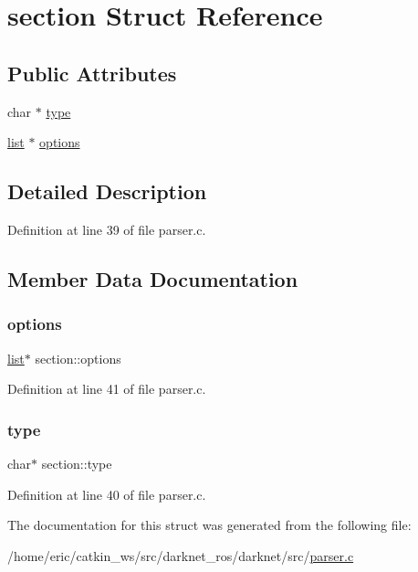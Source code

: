 \hypertarget{structsection}{}\section{section Struct Reference}
\label{structsection}
\subsection*{Public Attributes}
\begin{DoxyCompactItemize}
\item 
char $\ast$ \mbox{\hyperlink{structsection_a0dc7e80c65705ebee2764d1f1fe590f8}{type}}
\item 
\mbox{\hyperlink{structlist}{list}} $\ast$ \mbox{\hyperlink{structsection_a43f5552e0f6189b021835005204f3da6}{options}}
\end{DoxyCompactItemize}


\subsection{Detailed Description}


Definition at line 39 of file parser.\+c.



\subsection{Member Data Documentation}
\mbox{\label{structsection_a43f5552e0f6189b021835005204f3da6}} 
\subsubsection{\texorpdfstring{options}{options}}
{\footnotesize\ttfamily \mbox{\hyperlink{structlist}{list}}$\ast$ section\+::options}



Definition at line 41 of file parser.\+c.

\mbox{\label{structsection_a0dc7e80c65705ebee2764d1f1fe590f8}} 
\subsubsection{\texorpdfstring{type}{type}}
{\footnotesize\ttfamily char$\ast$ section\+::type}



Definition at line 40 of file parser.\+c.



The documentation for this struct was generated from the following file\+:\begin{DoxyCompactItemize}
\item 
/home/eric/catkin\+\_\+ws/src/darknet\+\_\+ros/darknet/src/\mbox{\hyperlink{parser_8c}{parser.\+c}}\end{DoxyCompactItemize}

